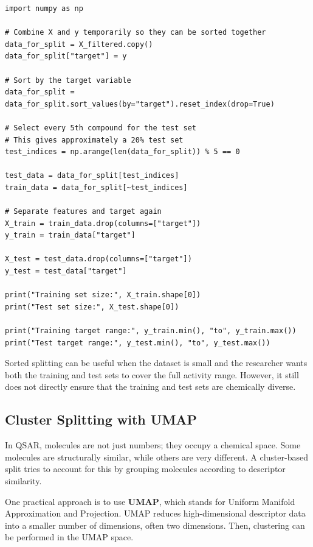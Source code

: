 \documentclass[11pt]{report}
\newenvironment{Important note}{\begin{quote}\color{red}\textbf{Important note:} }{\end{quote}}
\begin{document}
\begin{lstlisting}[style=pythonstyle, caption={Sorted split based on the target variable.}]
import numpy as np

# Combine X and y temporarily so they can be sorted together
data_for_split = X_filtered.copy()
data_for_split["target"] = y

# Sort by the target variable
data_for_split = data_for_split.sort_values(by="target").reset_index(drop=True)

# Select every 5th compound for the test set
# This gives approximately a 20% test set
test_indices = np.arange(len(data_for_split)) % 5 == 0

test_data = data_for_split[test_indices]
train_data = data_for_split[~test_indices]

# Separate features and target again
X_train = train_data.drop(columns=["target"])
y_train = train_data["target"]

X_test = test_data.drop(columns=["target"])
y_test = test_data["target"]

print("Training set size:", X_train.shape[0])
print("Test set size:", X_test.shape[0])

print("Training target range:", y_train.min(), "to", y_train.max())
print("Test target range:", y_test.min(), "to", y_test.max())
\end{lstlisting}

Sorted splitting can be useful when the dataset is small and the researcher wants both the training and test sets to cover the full activity range. However, it still does not directly ensure that the training and test sets are chemically diverse.

\subsection{Cluster Splitting with UMAP}

In QSAR, molecules are not just numbers; they occupy a chemical space. Some molecules are structurally similar, while others are very different. A cluster-based split tries to account for this by grouping molecules according to descriptor similarity.

One practical approach is to use \textbf{UMAP}, which stands for Uniform Manifold Approximation and Projection. UMAP reduces high-dimensional descriptor data into a smaller number of dimensions, often two dimensions. Then, clustering can be performed in the UMAP space.
\end{document}
